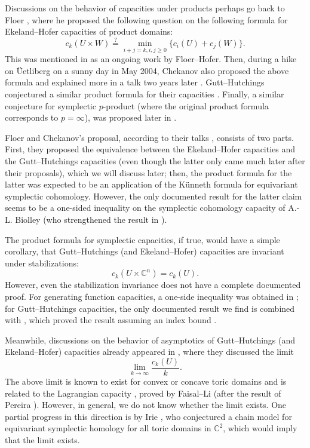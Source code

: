 \documentclass[11pt]{amsart}
\numberwithin{equation}{section}
\theoremstyle{plain}
\theoremstyle{definition}
\theoremstyle{remark}
\newcommand{\bC} { {\mathbb{C}}}
\begin{document}
Discussions on the behavior of capacities under products perhaps go back to Floer \cite{Floer_notes}, where he proposed the following question on the following formula for Ekeland--Hofer capacities of product domains:
\[c_k(U \times W) \stackrel{?}{=} \min_{i+j=k,i,j\geq 0}\{c_i(U) + c_j(W)\}.\]
This was mentioned in \cite[Proposition 4.4]{Viterbo_Seminaire_Bourbaki} as an ongoing work by Floer--Hofer. Then, during a hike on \"Uetliberg on a sunny day in May 2004, Chekanov also proposed the above formula \cite[Section 3.8]{quantitivesymplectic2010} and explained more in a talk two years later \cite{Chekanov_notes}. Gutt--Hutchings conjectured a similar product formula for their capacities \cite[Conjecture 1.9]{gutthutchings2018capacities}.
Finally, a similar conjecture for symplectic $p$-product (where the original product formula corresponds to $p=\infty$), was proposed later in \cite[Conjecture 1.6]{HaimKislevOstrover2023}.

Floer and Chekanov's proposal, according to their talks \cite{Floer_notes,Chekanov_notes}, consists of two parts. First, they proposed the equivalence between the Ekeland--Hofer capacities and the Gutt--Hutchings capacities (even though the latter only came much later after their proposals), which we will discuss later; then, the product formula for the latter was expected to be an application of the Künneth formula for equivariant symplectic cohomology. However, the only documented result for the latter claim seems to be a one-sided inequality on the symplectic cohomology capacity of A.-L. Biolley \cite[Proposition 2.5]{Biolley} (who strengthened the result in \cite[Section 4.3]{Oancea-kunneth}).

The product formula for symplectic capacities, if true, would have a simple corollary, that Gutt--Hutchings (and Ekeland--Hofer) capacities are invariant under stabilizations:
\[c_k(U \times \bC^n) = c_k(U).\]
However, even the stabilization invariance does not have a complete documented proof. For generating function capacities, a one-side inequality was obtained in \cite[Lemma 2.7]{Humiliere2008}; for Gutt--Hutchings capacities, the only documented result we find is \cite[Proposition 6.4]{SiegelHigherCapacities} combined with \cite[Theorem 7.64]{Pereira}, which proved the result assuming an index bound \cite[Assumption 5.6]{SiegelHigherCapacities}.

Meanwhile, discussions on the behavior of asymptotics of Gutt--Hutchings (and Ekeland--Hofer) capacities already appeared in \cite{quantitivesymplectic2010}, where they discussed the limit
\[\lim_{k\to \infty}\frac{c_k(U)}{k}.\]
The above limit is known to exist for convex or concave toric domains \cite{quantitivesymplectic2010,gutthutchings2018capacities} and is related to the Lagrangian capacity \cite[Conjecture 1.5]{CieliebakMohnke}, proved by Faisal--Li \cite{Faisal-Li} (after the result of Pereira \cite{Pereira}). However, in general, we do not know whether the limit exists. One partial progress in this direction is by Irie \cite{Irie_ChainModel}, who conjectured a chain model for equivariant symplectic homology for all toric domains in $\bC^2$, which would imply that the limit exists.
\end{document}
